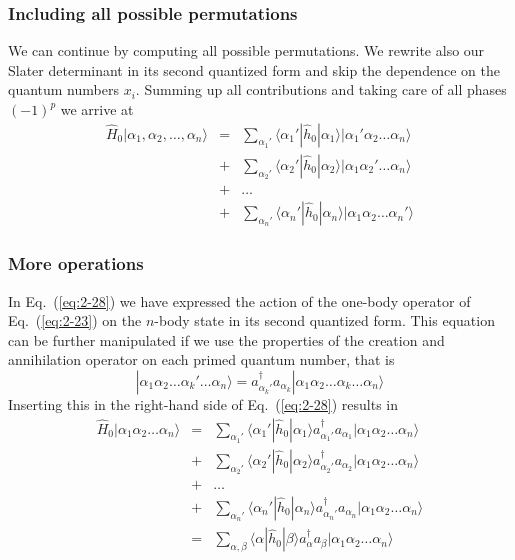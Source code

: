 \documentclass{beamer}
\begin{document}
\begin{frame}
\frametitle{Including all possible permutations}

We can continue by computing all possible permutations. 
We rewrite also our Slater determinant in its second quantized form and skip the dependence on the quantum numbers $x_i.$
Summing up all contributions and taking care of all phases
$(-1)^p$ we arrive at 
\begin{align}
	\hat{H}_0|\alpha_1,\alpha_2,\dots, \alpha_n\rangle &=& \sum_{\alpha_1'}\langle \alpha_1'|\hat{h}_0|\alpha_1\rangle
		|\alpha_1'\alpha_2 \dots \alpha_{n}\rangle \nonumber \\
	&+& \sum_{\alpha_2'} \langle \alpha_2'|\hat{h}_0|\alpha_2\rangle
		|\alpha_1\alpha_2' \dots \alpha_{n}\rangle \nonumber \\
	&+& \dots \nonumber \\
	&+& \sum_{\alpha_n'} \langle \alpha_n'|\hat{h}_0|\alpha_n\rangle
		|\alpha_1\alpha_2 \dots \alpha_{n}'\rangle \label{eq:2-28}
\end{align}
\end{frame}

\begin{frame}
\frametitle{More operations}

In Eq.~(\ref{eq:2-28}) 
we have expressed the action of the one-body operator
of Eq.~(\ref{eq:2-23}) on the  $n$-body state in its second quantized form.
This equation can be further manipulated if we use the properties of the creation and annihilation operator
on each primed quantum number, that is
\begin{equation}
	|\alpha_1\alpha_2 \dots \alpha_k' \dots \alpha_{n}\rangle = 
		a_{\alpha_k'}^{\dagger}  a_{\alpha_k} |\alpha_1\alpha_2 \dots \alpha_k \dots \alpha_{n}\rangle \label{eq:2-29}
\end{equation}
Inserting this in the right-hand side of Eq.~(\ref{eq:2-28}) results in
\begin{align}
	\hat{H}_0|\alpha_1\alpha_2 \dots \alpha_{n}\rangle &=& \sum_{\alpha_1'}\langle \alpha_1'|\hat{h}_0|\alpha_1\rangle
		a_{\alpha_1'}^{\dagger}  a_{\alpha_1} |\alpha_1\alpha_2 \dots \alpha_{n}\rangle \nonumber \\
	&+& \sum_{\alpha_2'} \langle \alpha_2'|\hat{h}_0|\alpha_2\rangle
		a_{\alpha_2'}^{\dagger}  a_{\alpha_2} |\alpha_1\alpha_2 \dots \alpha_{n}\rangle \nonumber \\
	&+& \dots \nonumber \\
	&+& \sum_{\alpha_n'} \langle \alpha_n'|\hat{h}_0|\alpha_n\rangle
		a_{\alpha_n'}^{\dagger}  a_{\alpha_n} |\alpha_1\alpha_2 \dots \alpha_{n}\rangle \nonumber \\
	&=& \sum_{\alpha, \beta} \langle \alpha|\hat{h}_0|\beta\rangle a_\alpha^{\dagger} a_\beta 
		|\alpha_1\alpha_2 \dots \alpha_{n}\rangle \label{eq:2-30a}
\end{align}
\end{frame}
\end{document}
